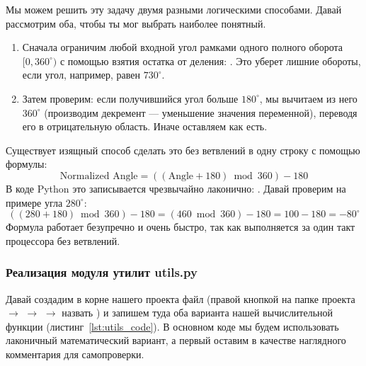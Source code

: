 Мы можем решить эту задачу двумя разными логическими способами. Давай рассмотрим оба, чтобы ты мог выбрать наиболее понятный.

\begin{enumerate}
    \item Сначала ограничим любой входной угол рамками одного полного оборота $[0, 360^\circ)$ с помощью взятия остатка от деления: . Это уберет лишние обороты, если угол, например, равен $730^\circ$.
    \item Затем проверим: если получившийся угол больше $180^\circ$, мы вычитаем из него $360^\circ$ (производим декремент — уменьшение значения переменной), переводя его в отрицательную область. Иначе оставляем как есть.
\end{enumerate}

Существует изящный способ сделать это без ветвлений в одну строку с помощью формулы:
\begin{equation}
\text{Normalized Angle} = ((\text{Angle} + 180) \bmod 360) - 180
\end{equation}
В коде Python это записывается чрезвычайно лаконично: . Давай проверим на примере угла $280^\circ$:
\begin{equation}
((280 + 180) \bmod 360) - 180 = (460 \bmod 360) - 180 = 100 - 180 = -80^\circ
\end{equation}
Формула работает безупречно и очень быстро, так как выполняется за один такт процессора без ветвлений.

\subsubsection{Реализация модуля утилит utils.py}

Давай создадим в корне нашего проекта файл  (правой кнопкой на папке проекта $\rightarrow$  $\rightarrow$  $\rightarrow$ назвать ) и запишем туда оба варианта нашей вычислительной функции (листинг~\ref{lst:utils_code}). В основном коде мы будем использовать лаконичный математический вариант, а первый оставим в качестве наглядного комментария для самопроверки.

